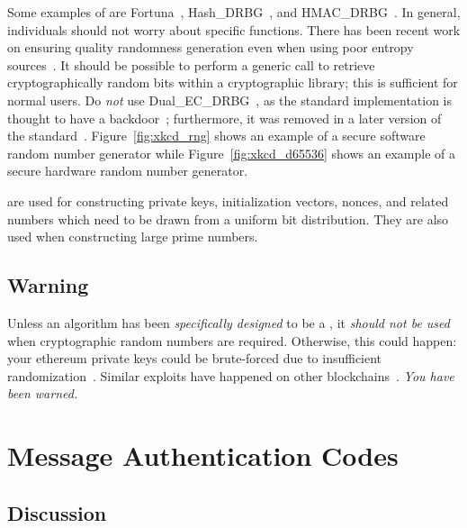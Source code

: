 Some examples of  are
Fortuna~\cite[Chapter 10]{PracticalCryptography}\cite[Chapter 9]{CryptoEng},
Hash\_DRBG~\cite[Section~10.1.1]{NIST-SP-800-90ARev1},
and HMAC\_DRBG~\cite[Section~10.1.2]{NIST-SP-800-90ARev1}.
In general, individuals should not worry about specific
 functions.
There has been recent work on ensuring quality randomness generation
even when using poor entropy sources~\cite{rfc8937,RandomnessImprovements2020}.
It should be possible to perform a generic call to retrieve
cryptographically random bits within a cryptographic library;
this is sufficient for normal users.
Do \emph{not} use Dual\_EC\_DRBG~\cite[Section~10.3.1]{NIST-SP-800-90A},
as the standard implementation
is thought to have a backdoor~\cite{BernsteinDualEC};
furthermore, it was removed in a later version
of the standard~\cite{NIST-SP-800-90ARev1}.
Figure~\ref{fig:xkcd_rng} shows an example of a
secure software random number generator
while Figure~\ref{fig:xkcd_d65536} shows an example of a
secure hardware random number generator.

 are used for constructing private keys,
\glspl{initialization vector}, \glspl{nonce},
and related numbers which need to be drawn from a uniform bit distribution.
They are also used when constructing large prime numbers.

\subsection{Warning}

Unless an algorithm has been \emph{specifically designed} to be a
,
it \emph{should not be used} when cryptographic random numbers are required.
Otherwise, this could happen:
your \gls{ethereum} private keys could be brute-forced due to
insufficient randomization~\cite{ProfanityBreak}.
Similar exploits have happened on other
blockchains~\cite{MilkSadExploit,TrustWalletExploit,TrustWalletLedger}.
\emph{You have been warned.}






\section{Message Authentication Codes}
\label{sec:symmetric_mac}

\subsection{Discussion}

